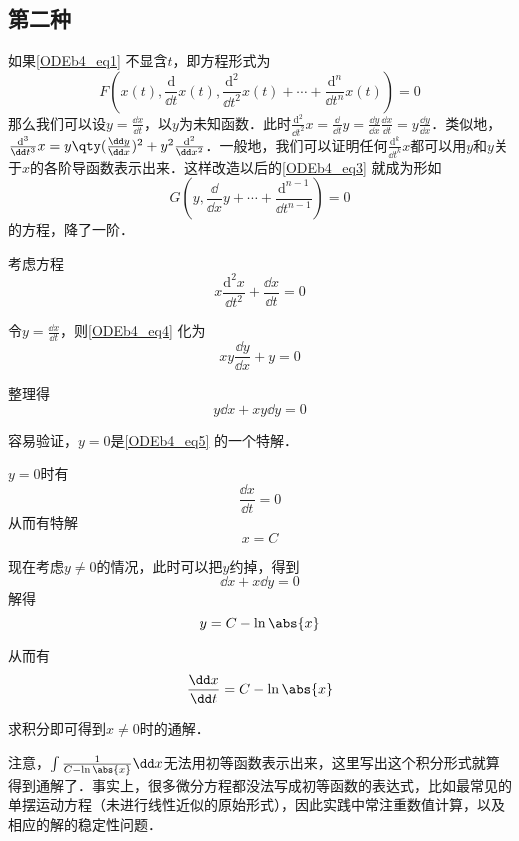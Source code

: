 \subsection{第二种}

如果\autoref{ODEb4_eq1} 不显含$t$，即方程形式为
\begin{equation}\label{ODEb4_eq3}
F(x(t), \frac{\mathrm{d}}{\dd t}x(t), \frac{\mathrm{d}^2}{\dd t^2}x(t)+\cdots+\frac{\mathrm{d}^n}{\dd t^n}x(t))=0
\end{equation}
那么我们可以设$y=\frac{\dd x}{\dd t}$，以$y$为未知函数．此时$\frac{\mathrm{d}^2}{\dd t^2}x=\frac{\dd}{\dd t}y=\frac{\dd y}{\dd x}\frac{\dd x}{\dd t}=y\frac{\dd y}{\dd x}$．类似地，$\frac{\mathrm{d}^3}{\dd t^3}x=y\qty(\frac{\dd y}{\dd x})^2+y^2\frac{\mathrm{d}^2}{\dd x^2}$．一般地，我们可以证明任何$\frac{\mathrm{d}^k}{\dd t^k}x$都可以用$y$和$y$关于$x$的各阶导函数表示出来．这样改造以后的\autoref{ODEb4_eq3} 就成为形如
\begin{equation}
G(y, \frac{\dd}{\dd x}y+\cdots+\frac{\mathrm{d}^{n-1}}{\dd t^{n-1}})=0
\end{equation}
的方程，降了一阶．

\begin{example}{}
考虑方程
\begin{equation}\label{ODEb4_eq4}
x\frac{\mathrm{d}^2 x}{\dd t^2}+\frac{\dd x}{\dd t}=0
\end{equation}

令$y=\frac{\dd x}{\dd t}$，则\autoref{ODEb4_eq4} 化为
\begin{equation}\label{ODEb4_eq5}
xy\frac{\dd y}{\dd x}+y=0
\end{equation}

整理得
\begin{equation}
y\dd x+xy\dd y=0
\end{equation}

容易验证，$y=0$是\autoref{ODEb4_eq5} 的一个特解．

$y=0$时有
\begin{equation}
\frac{\dd x}{\dd t}=0
\end{equation}
从而有特解
\begin{equation}
x=C
\end{equation}

现在考虑$y\neq 0$的情况，此时可以把$y$约掉，得到
\begin{equation}\label{ODEb4_eq6}
\dd x+x\dd y=0
\end{equation}
解得
\begin{equation}
y=C-\ln\abs{x}
\end{equation}

从而有
\begin{equation}
\frac{\dd x}{\dd t}=C-\ln\abs{x}
\end{equation}

求积分即可得到$x\neq 0$时的通解．

注意，$\int\frac{1}{C-\ln\abs{x}}\dd x$无法用初等函数表示出来，这里写出这个积分形式就算得到通解了．事实上，很多微分方程都没法写成初等函数的表达式，比如最常见的单摆运动方程（未进行线性近似的原始形式），因此实践中常注重数值计算，以及相应的解的稳定性问题．

\end{example}


